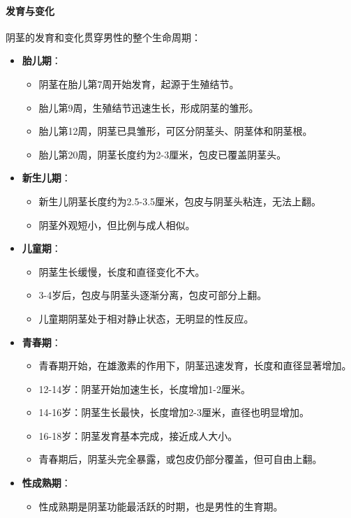 \paragraph{发育与变化}

阴茎的发育和变化贯穿男性的整个生命周期：

\begin{itemize}
\item \textbf{胎儿期}：
  \begin{itemize}
  \item 阴茎在胎儿第7周开始发育，起源于生殖结节。
  \item 胎儿第9周，生殖结节迅速生长，形成阴茎的雏形。
  \item 胎儿第12周，阴茎已具雏形，可区分阴茎头、阴茎体和阴茎根。
  \item 胎儿第20周，阴茎长度约为2-3厘米，包皮已覆盖阴茎头。
  \end{itemize}
\item \textbf{新生儿期}：
  \begin{itemize}
  \item 新生儿阴茎长度约为2.5-3.5厘米，包皮与阴茎头粘连，无法上翻。
  \item 阴茎外观短小，但比例与成人相似。
  \end{itemize}
\item \textbf{儿童期}：
  \begin{itemize}
  \item 阴茎生长缓慢，长度和直径变化不大。
  \item 3-4岁后，包皮与阴茎头逐渐分离，包皮可部分上翻。
  \item 儿童期阴茎处于相对静止状态，无明显的性反应。
  \end{itemize}
\item \textbf{青春期}：
  \begin{itemize}
  \item 青春期开始，在雄激素的作用下，阴茎迅速发育，长度和直径显著增加。
  \item 12-14岁：阴茎开始加速生长，长度增加1-2厘米。
  \item 14-16岁：阴茎生长最快，长度增加2-3厘米，直径也明显增加。
  \item 16-18岁：阴茎发育基本完成，接近成人大小。
  \item 青春期后，阴茎头完全暴露，或包皮仍部分覆盖，但可自由上翻。
  \end{itemize}
\item \textbf{性成熟期}：
  \begin{itemize}
  \item 性成熟期是阴茎功能最活跃的时期，也是男性的生育期。

\end{itemize}
\end{itemize}

